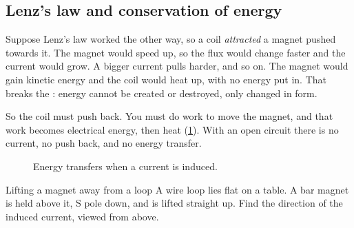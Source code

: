 \subsection{Lenz's law and conservation of energy}

Suppose Lenz's law worked the other way, so a coil \emph{attracted} a magnet
pushed towards it. The magnet would speed up, so the flux would change faster
and the current would grow. A bigger current pulls harder, and so on. The magnet
would gain kinetic energy and the coil would heat up, with no energy put in. That
breaks the : energy cannot be created or
destroyed, only changed in form.

So the coil must push back. You must do work to move the magnet, and that work
becomes electrical energy, then heat (\cref{ch3:fig:energy}). With an open
circuit there is no current, no push back, and no energy transfer.

\begin{figure}
  \centering
  \caption{Energy transfers when a current is induced.}\label{ch3:fig:energy}
\end{figure}

\begin{workedexample}{Lifting a magnet away from a loop}\label{ch3:we:lift}
A wire loop lies flat on a table. A bar magnet is held above it, S pole down,
and is lifted straight up. Find the direction of the induced current, viewed
from above.
\end{workedexample}

